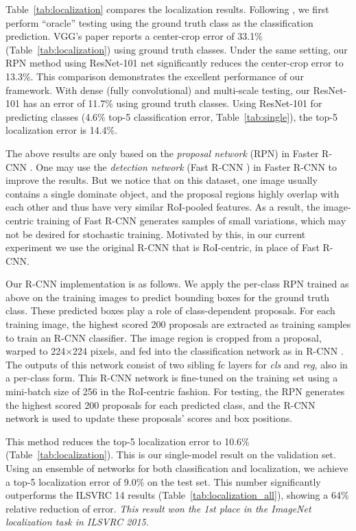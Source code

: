 \documentclass[10pt,twocolumn,letterpaper]{article}
\begin{document}
Table~\ref{tab:localization} compares the localization results. Following \cite{Simonyan2015}, we first perform ``oracle'' testing using the ground truth class as the classification prediction. VGG's paper \cite{Simonyan2015} reports a center-crop error of 33.1\% (Table~\ref{tab:localization}) using ground truth classes. Under the same setting, our RPN method using ResNet-101 net significantly reduces the center-crop error to 13.3\%. This comparison demonstrates the excellent performance of our framework.
With dense (fully convolutional) and multi-scale testing, our ResNet-101 has an error of 11.7\% using ground truth classes. Using ResNet-101 for predicting classes (4.6\% top-5 classification error, Table~\ref{tab:single}), the top-5 localization error is 14.4\%.

The above results are only based on the \emph{proposal network} (RPN) in Faster R-CNN \cite{Ren2015}. One may use the \emph{detection network} (Fast R-CNN \cite{Girshick2015}) in Faster R-CNN to improve the results. But we notice that on this dataset, one image usually contains a single dominate object, and the proposal regions highly overlap with each other and thus have very similar RoI-pooled features. As a result, the image-centric training of Fast R-CNN \cite{Girshick2015} generates samples of small variations, which may not be desired for stochastic training. Motivated by this, in our current experiment we use the original R-CNN \cite{Girshick2014} that is RoI-centric, in place of Fast R-CNN.

Our R-CNN implementation is as follows. We apply the per-class RPN trained as above on the training images to predict bounding boxes for the ground truth class. These predicted boxes play a role of class-dependent proposals.
For each training image, the highest scored 200 proposals are extracted as training samples to train an R-CNN classifier. The image region is cropped from a proposal, warped to 224$\times$224 pixels, and fed into the classification network as in R-CNN \cite{Girshick2014}. The outputs of this network consist of two sibling fc layers for \emph{cls} and \emph{reg}, also in a per-class form.
This R-CNN network is fine-tuned on the training set using a mini-batch size of 256 in the RoI-centric fashion. For testing, the RPN generates the highest scored 200 proposals for each predicted class, and the R-CNN network is used to update these proposals' scores and box positions.

This method reduces the top-5 localization error to 10.6\% (Table~\ref{tab:localization}). This is our single-model result on the validation set. Using an ensemble of networks for both classification and localization, we achieve a top-5 localization error of 9.0\% on the test set. This number significantly outperforms the ILSVRC 14 results (Table~\ref{tab:localization_all}), showing a 64\% relative reduction of error. \emph{This result won the 1st place in the ImageNet localization task in ILSVRC 2015.}
\end{document}
